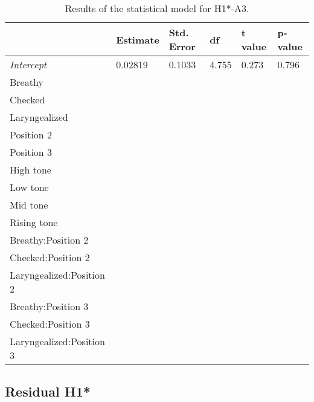 \documentclass[12pt, letterpaper]{article}
\providecommand{\lsptoprule}{\midrule\toprule}
\providecommand{\lspbottomrule}{\bottomrule\midrule}
\begin{document}
\begin{table}[!h]
  \centering
  \caption{Results of the statistical model for H1*-A3.}
  \label{tab:H1A3Results}
  \begin{tabular}{llllll}
    \lsptoprule
     & Estimate & Std. Error & df & t value & p-value \\ \hline
    \textit{Intercept} & 0.02819 & 0.1033 & 4.755 & 0.273 & 0.796 \\
    Breathy &&&&& \\
    Checked &&&&& \\
    Laryngealized &&&&& \\
    Position 2 &&&&& \\
    Position 3 &&&&& \\
    High tone &&&&& \\
    Low tone &&&&& \\
    Mid tone &&&&& \\
    Rising tone &&&&& \\
    Breathy:Position 2 &&&&& \\
    Checked:Position 2 &&&&& \\
    Laryngealized:Position 2 &&&&& \\
    Breathy:Position 3 &&&&& \\
    Checked:Position 3 &&&&& \\
    Laryngealized:Position 3 &&&&& \\
    \lspbottomrule
  \end{tabular}
\end{table}

\subsection{Residual H1*} \label{sec:ResidH1}
\end{document}
